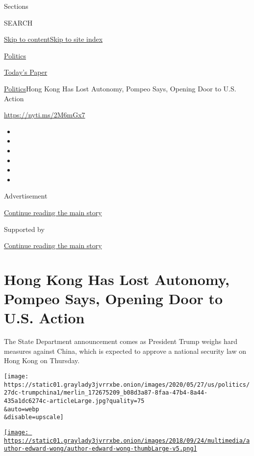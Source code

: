 Sections

SEARCH

\protect\hyperlink{site-content}{Skip to
content}\protect\hyperlink{site-index}{Skip to site index}

\href{https://www.nytimes3xbfgragh.onion/section/politics}{Politics}

\href{https://myaccount.nytimes3xbfgragh.onion/auth/login?response_type=cookie\&client_id=vi}{}

\href{https://www.nytimes3xbfgragh.onion/section/todayspaper}{Today's
Paper}

\href{/section/politics}{Politics}\textbar{}Hong Kong Has Lost Autonomy,
Pompeo Says, Opening Door to U.S. Action

\url{https://nyti.ms/2M6mGx7}

\begin{itemize}
\item
\item
\item
\item
\item
\item
\end{itemize}

Advertisement

\protect\hyperlink{after-top}{Continue reading the main story}

Supported by

\protect\hyperlink{after-sponsor}{Continue reading the main story}

\hypertarget{hong-kong-has-lost-autonomy-pompeo-says-opening-door-to-us-action}{%
\section{Hong Kong Has Lost Autonomy, Pompeo Says, Opening Door to U.S.
Action}\label{hong-kong-has-lost-autonomy-pompeo-says-opening-door-to-us-action}}

The State Department announcement comes as President Trump weighs hard
measures against China, which is expected to approve a national security
law on Hong Kong on Thursday.

\texttt{[image: https://static01.graylady3jvrrxbe.onion/images/2020/05/27/us/politics/27dc-trumpchina1/merlin\_172675209\_b08d3a87-8faa-47b4-8a44-435a1dc6274c-articleLarge.jpg?quality=75\\\&auto=webp\\\&disable=upscale]}

\href{https://www.nytimes3xbfgragh.onion/by/edward-wong}{\texttt{[image: https://static01.graylady3jvrrxbe.onion/images/2018/09/24/multimedia/author-edward-wong/author-edward-wong-thumbLarge-v5.png]}}

